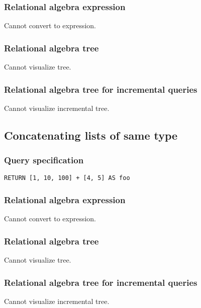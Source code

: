 \subsubsection*{Relational algebra expression}

Cannot convert to expression.

\subsubsection*{Relational algebra tree}

Cannot visualize tree.

\subsubsection*{Relational algebra tree for incremental queries}

Cannot visualize incremental tree.

\subsection{Concatenating lists of same type}

\subsubsection*{Query specification}

\begin{lstlisting}
RETURN [1, 10, 100] + [4, 5] AS foo
\end{lstlisting}

\subsubsection*{Relational algebra expression}

Cannot convert to expression.

\subsubsection*{Relational algebra tree}

Cannot visualize tree.

\subsubsection*{Relational algebra tree for incremental queries}

Cannot visualize incremental tree.

